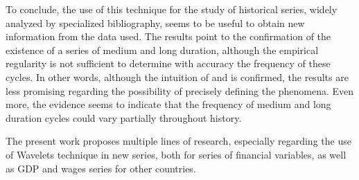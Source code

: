 \documentclass[a4paper]{article}
\begin{document}
	To conclude, the use of this technique for the study of historical series, widely analyzed by specialized bibliography, seems to be useful to obtain new information from the data used. The results point to the confirmation of the existence of a series of medium and long duration, although the empirical regularity is not sufficient to determine with accuracy the frequency of these cycles. In other words, although the intuition of \cite{kuznets1930secular} and \cite{kondratieff1979long} is confirmed, the results are less promising regarding the possibility of precisely defining the phenomena. Even more, the evidence seems to indicate that the frequency of medium and long duration cycles could vary partially throughout history.
	
	The present work proposes multiple lines of research, especially regarding the use of Wavelets technique in new series, both for series of financial variables, as well as GDP and wages series for other countries.
	
	
	
	
	
\end{document}
